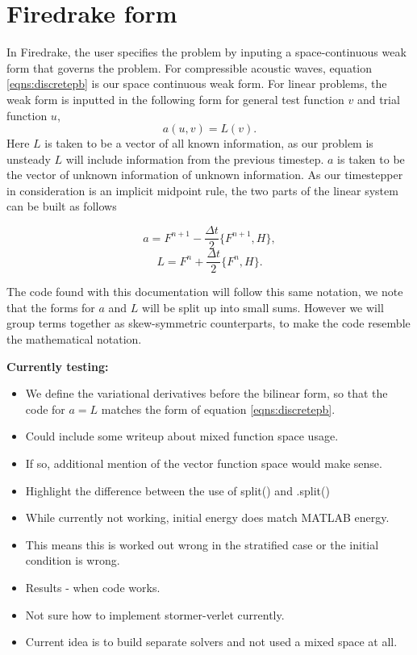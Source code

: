 \documentclass[a4paper,11pt]{article}
\begin{document}
\section{Firedrake form}

In Firedrake, the user specifies the problem by inputing a space-continuous weak form that governs the problem. For compressible acoustic waves, equation \eqref{eqns:discretepb} is our space continuous weak form. For linear problems, the weak form is inputted in the following form for general test function $v$ and trial function $u$,
\[ a(u,v) = L(v).\]
Here $L$ is taken to be a vector of all known information, as our problem is unsteady $L$ will include information from the previous timestep. $a$ is taken to be the vector of unknown information of unknown information. As our timestepper in consideration is an implicit midpoint rule, the two parts of the linear system can be built as follows

\[ a = F^{n+1} - \frac{\Delta t}{2} \{ F^{n+1} , H\} ,\]
\[ L = F^{n} + \frac{\Delta t}{2} \{ F^{n} , H\}. \]

The code found with this documentation will follow this same notation, we note that the forms for $a$ and $L$ will be split up into small sums. However we will group terms together as skew-symmetric counterparts, to make the code resemble the mathematical notation. 


\textbf{ Currently testing:} 
\begin{itemize}
\item We define the variational derivatives before the bilinear form, so that the code for $ a = L$ matches the form of equation \eqref{eqns:discretepb}.
\item Could include some writeup about mixed function space usage.
\item If so, additional mention of the vector function space would make sense.
\item Highlight the difference between the use of split() and .split()
\item While currently not working, initial energy does match MATLAB energy.
\item This means this is worked out  wrong in the stratified case or the initial condition is wrong.
\item Results - when code works.
\item Not sure how to implement stormer-verlet currently.
\item Current idea is to build separate solvers and not used a mixed space at all.
\end{itemize}
\end{document}

